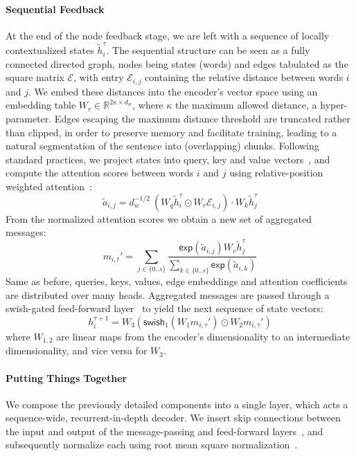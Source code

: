 \paragraph{Sequential Feedback}
At the end of the node feedback stage, we are left with a sequence of locally contextualized states $\tilde{h}^\tau_i$.
The sequential structure can be seen as a fully connected directed graph, nodes being states (words) and edges tabulated as the square matrix $\mathcal{E}$, with entry $\mathcal{E}_{i, j}$ containing the relative distance between words $i$ and $j$.
We embed these distances into the encoder's vector space using an embedding table $W_r \in \mathbb{R}^{2\kappa \times d_w}$, where $\kappa$ the maximum allowed distance, a hyper-parameter.
Edges escaping the maximum distance threshold are truncated rather than clipped, in order to preserve memory and facilitate training, leading to a natural segmentation of the sentence into (overlapping) chunks.
Following standard practices, we project states into query, key and value vectors~\cite{vaswani2017attention}, and compute the attention scores between words $i$ and $j$ using relative-position weighted attention~\cite{shaw-etal-2018-self}:
\begin{equation}
\tilde{a}_{i,j} = d_w^{-1/2}~(W_q \tilde{h}^\tau_i \odot W_r\mathcal{E}_{i,j}) \cdot W_k\tilde{h}^\tau_j
\end{equation}
From the normalized attention scores we obtain a new set of aggregated messages:
\begin{equation}
m_{i,t}' = \sum_{j \in \{0..s\}} \frac{\mathsf{exp}(\tilde{a}_{i,j}) W_v\tilde{h}^\tau_j}{
\sum_{k\in \{0..s\}}
\mathsf{exp}(\tilde{a}_{i,k})}
\end{equation}
Same as before, queries, keys, values, edge embeddings and attention coefficients are distributed over many heads. 
Aggregated messages are passed through a swish-gated feed-forward layer~\cite{dauphin2017language,shazeer2020glu} to yield the next sequence of state vectors:
\begin{equation}
h^{\tau+1}_i = W_3\left(\mathsf{swish}_1(W_1 m_{i,\tau}')\odot W_2m_{i,\tau}'\right)
\end{equation}
where $W_{1,2}$ are linear maps from the encoder's dimensionality to an intermediate dimensionality, and vice versa for $W_3$.

\paragraph{Putting Things Together}
We compose the previously detailed components into a single layer, which acts a sequence-wide, recurrent-in-depth decoder.
We insert skip connections between the input and output of the message-passing and feed-forward layers~\cite{he2016deep}, and subsequently normalize each using root mean square normalization~\cite{zhang2019root}.

